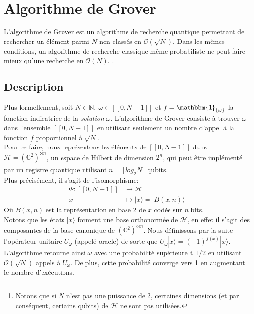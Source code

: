 \section{Algorithme de Grover}
\label{part1}

L’algorithme de Grover est un algorithme de recherche quantique permettant de rechercher un élément parmi $N$ non classés en $\mathcal{O}(\sqrt{N})$.
Dans les mêmes conditions, un algorithme de recherche classique même probabiliste ne peut faire mieux qu'une recherche en $\mathcal{O}(N)$. \cite{grover1996fast}. 
 
\subsection{Description}

Plus formellement, soit $N \in \mathbb{N}, \ \omega \in [\![0, N-1]\!]$ et $f = \mathbbm{1}_{\{ \omega \}}$ la fonction indicatrice de la \textit{solution} $\omega$.
L'algorithme de Grover consiste à trouver $\omega$ dans l'ensemble $[\![0, N-1]\!]$ en utilisant seulement un nombre d'appel à la fonction $f$ proportionnel à $\sqrt{N}$. 
\\
Pour ce faire, nous représentons les éléments de $[\![0, N-1]\!]$ dans $\mathcal{H} = (\mathbb{C}^2)^{\otimes n}$, un espace de Hilbert de dimension $2^n$, qui peut être implémenté par un registre quantique utilisant $n=\lceil{log_{2} N} \rceil$ qubits.\footnote{Notons que si $N$ n'est pas une puissance de 2, certaines dimensions (et par conséquent, certains qubits) de $\mathcal{H}$ ne sont pas utilisées. }
\\
Plus précisément, il s'agit de l'isomorphisme:
\begin{align*}
	\Phi : [\![0, N-1]\!] &\longrightarrow \mathcal{H} \\
	x &\longmapsto | x \rangle = | B(x, n)\rangle
\end{align*}
Où $B(x, n)$ est la représentation en base 2 de $x$ codée sur $n$ bits.\footnotemark
{}
\\
Notons que les états $| x \rangle$ forment une base orthonormée de $\mathcal{H}$, en effet il s'agit des composantes de la base canonique de $(\mathbb{C}^2)^{\otimes n}$.
Nous définissons par la suite l'opérateur unitaire $U_{\omega}$ (appelé oracle) de sorte que $U_{\omega}|x\rangle = (-1)^{f(x)}|x\rangle$. 
\\
L'algorithme retourne ainsi $\omega$ avec une probabilité supérieure à 1/2 en utilisant $\mathcal{O}(\sqrt{N})$ appels à $U_{\omega}$. De plus, cette probabilité converge vers 1 en augmentant le nombre d'exécutions.

